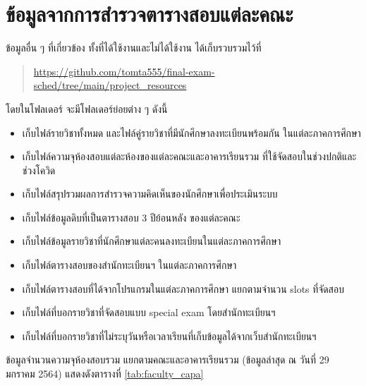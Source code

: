 \section{ข้อมูลจากการสำรวจตารางสอบแต่ละคณะ}
ข้อมูลอื่น ๆ ที่เกี่ยวข้อง ทั้งที่ได้ใช้งานและไม่ได้ใช้งาน ได้เก็บรวบรวมไว้ที่
\begin{quote}
\small
\url{https://github.com/tomta555/final-exam-sched/tree/main/project_resources}
\end{quote}
โดยในโฟลเดอร์  จะมีโฟลเดอร์ย่อยต่าง ๆ ดังนี้ 
\begin{itemize}
  \item {} เก็บไฟล์รายวิชาทั้งหมด และไฟล์คู่รายวิชาที่มีนักศึกษาลงทะเบียนพร้อมกัน ในแต่ละภาคการศึกษา
  \item {} เก็บไฟล์ความจุห้องสอบแต่ละห้องของแต่ละคณะและอาคารเรียนรวม ที่ใช้จัดสอบในช่วงปกติและช่วงโควิด
  \item {} เก็บไฟล์สรุปรวมผลการสำรวจความคิดเห็นของนักศึกษาเพื่อประเมินระบบ
  \item {} เก็บไฟล์ข้อมูลดิบที่เป็นตารางสอบ 3 ปีย้อนหลัง ของแต่ละคณะ
  \item {} เก็บไฟล์ข้อมูลรายวิชาที่นักศึกษาแต่ละคนลงทะเบียนในแต่ละภาคการศึกษา
  \item {} เก็บไฟล์ตารางสอบของสำนักทะเบียนฯ ในแต่ละภาคการศึกษา
  \item {} เก็บไฟล์ตารางสอบที่ได้จากโปรแกรมในแต่ละภาคการศึกษา แยกตามจำนวน slots ที่จัดสอบ
  \item {} เก็บไฟล์ที่บอกรายวิชาที่จัดสอบแบบ special exam โดยสำนักทะเบียนฯ
  \item {} เก็บไฟล์ที่บอกรายวิชาที่ไม่ระบุวันหรือเวลาเรียนที่เก็บข้อมูลได้จากเว็บสำนักทะเบียนฯ
\end{itemize}

\noindent ข้อมูลจำนวนความจุห้องสอบรวม แยกตามคณะและอาคารเรียนรวม (ข้อมูลล่าสุด ณ วันที่ 29 มกราคม 2564) แสดงดังตารางที่ \ref{tab:faculty_capa}

